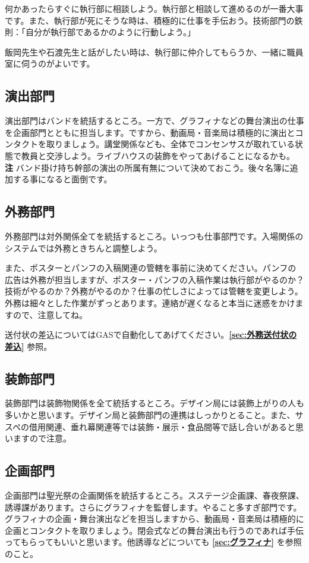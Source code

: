 \documentclass[dvipdfmx,jb5]{jarticle}
\begin{document}
何かあったらすぐに執行部に相談しよう。執行部と相談して進めるのが一番大事です。また、執行部が死にそうな時は、積極的に仕事を手伝おう。技術部門の鉄則：「自分が執行部であるかのように行動しよう。」

飯岡先生や石渡先生と話がしたい時は、執行部に仲介してもらうか、一緒に職員室に伺うのがよいです。

\subsection{演出部門}\label{sec:演出部門}
演出部門はバンドを統括するところ。一方で、グラフィナなどの舞台演出の仕事を企画部門とともに担当します。ですから、動画局・音楽局は積極的に演出とコンタクトを取りましょう。講堂関係なども、全体でコンセンサスが取れている状態で教員と交渉しよう。ライブハウスの装飾をやってあげることになるかも。\\
{\bf 注} バンド掛け持ち幹部の演出の所属有無について決めておこう。後々名簿に追加する事になると面倒です。

\subsection{外務部門}
外務部門は対外関係全てを統括するところ。いっつも仕事部門です。入場関係のシステムでは外務ときちんと調整しよう。

また、ポスターとパンフの入稿関連の管轄を事前に決めてください。パンフの広告は外務が担当しますが、ポスター・パンフの入稿作業は執行部がやるのか？技術がやるのか？外務がやるのか？仕事の忙しさによっては管轄を変更しよう。外務は細々とした作業がずっとあります。連絡が遅くなると本当に迷惑をかけますので、注意してね。

送付状の差込についてはGASで自動化してあげてください。{\bf \ref{sec:外務送付状の差込}} 参照。

\subsection{装飾部門}
装飾部門は装飾物関係を全て統括するところ。デザイン局には装飾上がりの人も多いかと思います。デザイン局と装飾部門の連携はしっかりとること。また、サスペの借用関連、垂れ幕関連等では装飾・展示・食品間等で話し合いがあると思いますので注意。

\subsection{企画部門}
企画部門は聖光祭の企画関係を統括するところ。スステージ企画課、春夜祭課、誘導課があります。さらにグラフィナを監督します。やること多すぎ部門です。
グラフィナの企画・舞台演出などを担当しますから、動画局・音楽局は積極的に企画とコンタクトを取りましょう。閉会式などの舞台演出も行うのであれば手伝ってもらってもいいと思います。他誘導などについても {\bf \ref{sec:グラフィナ}} を参照のこと。
\end{document}
